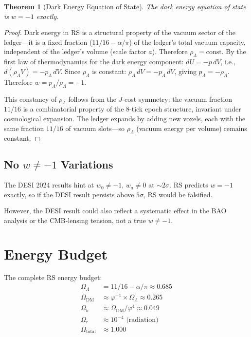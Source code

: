 \documentclass[12pt,a4paper]{article}
\newtheorem{theorem}{Theorem}[section]
\theoremstyle{definition}
\theoremstyle{remark}
\begin{document}
\begin{theorem}[Dark Energy Equation of State]\label{thm:w-minus-one}
The dark energy equation of state is $w = -1$ exactly.
\end{theorem}
\begin{proof}
Dark energy in RS is a structural property of the vacuum
sector of the ledger---it is a fixed fraction ($11/16 - \alpha/\pi$)
of the ledger's total vacuum capacity, independent of the ledger's
volume (scale factor $a$).  Therefore $\rho_\Lambda = \mathrm{const}$.
By the first law of thermodynamics for the dark energy component:
$dU = -p\,dV$, i.e., $d(\rho_\Lambda V) = -p_\Lambda\,dV$.  Since
$\rho_\Lambda$ is constant: $\rho_\Lambda\,dV = -p_\Lambda\,dV$,
giving $p_\Lambda = -\rho_\Lambda$.  Therefore
$w = p_\Lambda/\rho_\Lambda = -1$.

This constancy of $\rho_\Lambda$ follows from the $J$-cost symmetry:
the vacuum fraction $11/16$ is a combinatorial property of the
8-tick epoch structure, invariant under cosmological expansion.
The ledger expands by adding new voxels, each with the same fraction
$11/16$ of vacuum slots---so $\rho_\Lambda$ (vacuum energy per volume)
remains constant.
\end{proof}

\subsection{No $w \neq -1$ Variations}

The DESI 2024 results hint at $w_0 \neq -1$, $w_a \neq 0$ at $\sim 2\sigma$. 
RS predicts $w = -1$ exactly, so if the DESI result persists above $5\sigma$, 
RS would be falsified.

However, the DESI result could also reflect a systematic effect in the BAO analysis 
or the CMB-lensing tension, not a true $w \neq -1$.

\section{Energy Budget}

The complete RS energy budget:
\begin{align}
\Omega_\Lambda &= 11/16 - \alpha/\pi \approx 0.685 \\
\Omega_\mathrm{DM} &\approx \varphi^{-1} \times \Omega_\Lambda \approx 0.265 \\
\Omega_b &\approx \Omega_\mathrm{DM} / \varphi^4 \approx 0.049 \\
\Omega_r &\approx 10^{-4} \text{ (radiation)} \\
\Omega_\mathrm{total} &\approx 1.000
\end{align}
\end{document}
